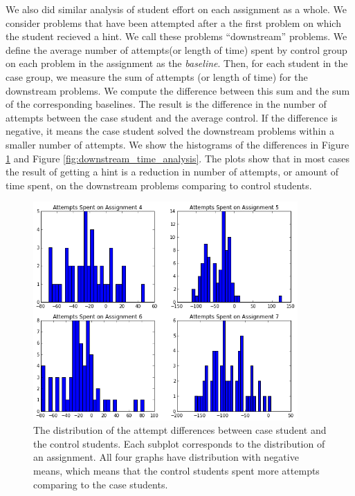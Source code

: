 \documentclass{llncs2e/llncs}
\begin{document}
We also did similar analysis of student effort on each assignment as a
whole. We consider problems that have been attempted after a the first
problem on which the student recieved a hint. We call these problems
``downstream'' problems. We define the average number of attempts(or
length of time) spent by control group on each problem in the
assignment as the {\em baseline}. Then, for each student in the case
group, we measure the sum of attempts (or length of time) for the
downstream problems. We compute the difference between this sum and
the sum of the corresponding baselines. The result is the difference
in the number of attempts between the case student and the average
control. If the difference is negative, it means the case student
solved the downstream problems within a smaller number of attempts.
We show the histograms of the differences in Figure
\ref{fig:downstream_tries_analysis} and Figure
\ref{fig:downstream_time_analysis}. The plots show that in most cases
the result of getting a hint is a reduction in number of attempts, or
amount of time spent, on the downstream problems comparing to control
students.

\begin{figure}[ht]
\centering
\includegraphics[width=0.9\textwidth]{image/assignment_tries_downstream.png}
\caption{The distribution of the attempt differences between case student and the control students. Each subplot corresponds to the distribution of an assignment. All four graphs have distribution with negative means, which means that the control students spent more attempts comparing to the case students.}
    \label{fig:downstream_tries_analysis}
\end{figure}
\end{document}
